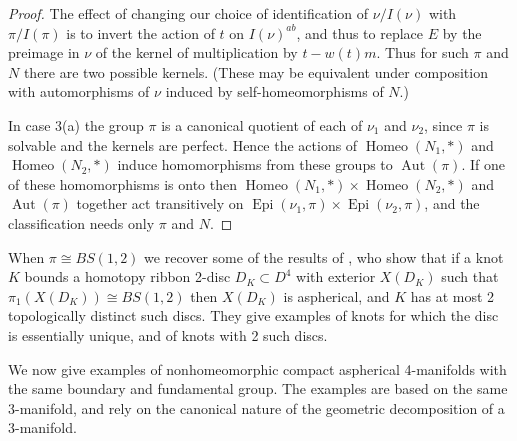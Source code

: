 \documentclass[12pt]{amsart}
\theoremstyle{definition}
\DeclareMathOperator{\Aut}{Aut}
\DeclareMathOperator{\Epi}{Epi}
\DeclareMathOperator{\Homeo}{Homeo}
\begin{document}
\begin{proof}
The effect of changing our choice of identification of $\nu/I(\nu)$ with $\pi/I(\pi)$
is to invert the action of $t$ on $I(\nu)^{ab}$, and thus to replace
$E$ by the preimage in $\nu$ of the kernel of multiplication by $t-w(t)m$.
Thus for such $\pi$ and $N$ there are two possible kernels.
(These may be equivalent under composition with automorphisms of $\nu$ 
induced by self-homeomorphisms of $N$.)




In case 3(a) the group $\pi$ is a canonical quotient of each of $\nu_1$
and $\nu_2$, since $\pi$ is solvable and the kernels are perfect.
Hence the actions of $\Homeo(N_1,*)$ and $\Homeo(N_2,*)$ induce homomorphisms 
from these groups to $\Aut(\pi)$. 
If one of these homomorphisms is onto then $\Homeo(N_1,*)\times{\Homeo(N_2,*)}$ and   $\Aut(\pi)$ together act transitively on $\Epi(\nu_1,\pi)\times{\Epi(\nu_2,\pi)}$,
and the classification needs only $\pi$ and $N$.  
\end{proof}

When $\pi\cong{BS(1,2)}$ we recover some of the results of \cite{CP}, 
who show that if a knot $K$ bounds a homotopy ribbon 2-disc $D_K\subset{D^4}$ 
with exterior $X(D_K)$ such that $\pi_1(X(D_K))\cong{BS(1,2)}$ then 
$X(D_K)$ is aspherical,  and $K$ has at most 2 topologically distinct such discs.
They give examples of knots for which the disc is essentially unique,
and of knots with 2 such discs.

We now give examples of nonhomeomorphic compact aspherical 4-manifolds with the same boundary and fundamental group.  The examples 
 are  based on the same 3-manifold,
and rely on the canonical nature of the geometric decomposition of a 3-manifold.
\end{document}

